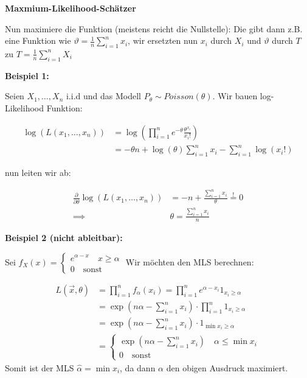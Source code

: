 \documentclass[25pt]{sciposter}
\renewcommand{\hat}{\widehat}
\newenvironment{method}[1]{\begin{mdframed}[backgroundcolor=blue!10,innertopmargin=15pt, innerbottommargin=15pt,nobreak=true]
		\textbf{#1 }
	}
	{ 
	\end{mdframed}
}
\begin{document}
\begin{multicols}{3}
\begin{method}{Maxmium-Likelihood-Schätzer}
			Nun maximiere die Funktion (meistens reicht die Nullstelle): Die gibt dann z.B. eine Funktion wie $\vartheta = \frac{1}{n}\sum_{i=1}^{n}x_i$, wir ersetzten nun $x_i$ durch $X_i$ und $\vartheta$ durch $T$ zu $T = \frac{1}{n}\sum_{i=1}^{n}X_i$
		\end{method}
		
		\textbf{Beispiel 1:}
		
		Seien $X_1,\ldots,X_n$ i.i.d und das Modell $P_{\theta}\sim Poisson(\theta)$. Wir bauen log-Likelihood Funktion:
		
		\begin{align*}
			\log(L(x_1,\ldots,x_n)) &= \log\left(\prod_{i=1}^{n} e^{-\theta} \frac{\theta^{x_i}}{x_i !} \right)\\ &= -\theta n + \log(\theta) \sum_{i=1}^{n} x_i - \sum_{i=1}^{n}\log(x_i !)
		\end{align*}
		
		nun leiten wir ab:
		
		\begin{align*}
			\frac{\partial}{\partial \theta}\log(L(x_1,\ldots,x_n)) &= -n + \frac{\sum_{i=1}^{n}x_i}{\theta} \stackrel{!}{=} 0 \\
			\implies & \theta = \frac{\sum_{i=1}^{n} x_i}{n}
		\end{align*}
		
		\textbf{Beispiel 2 (nicht ableitbar):}
		
		Sei $f_X(x) = \begin{cases}
			e^{\alpha - x} \quad x \geq \alpha\\
			0 \quad \text{sonst}
		\end{cases}$ Wir möchten den MLS berechnen:
		
		\begin{align*}
			L(\vec{x},\theta) &= \prod_{i=1}^{n} f_\alpha (x_i) = \prod_{i=1}^{n} e^{\alpha - x_i} 1_{x_i \geq \alpha}\\
			&= \exp \left(n\alpha - \sum_{i=1}^{n} x_i \right) \cdot \prod_{i=1}^{n} 1_{x_i\geq \alpha}\\
			&= \exp \left(n\alpha - \sum_{i=1}^{n} x_i \right) \cdot 1_{\min x_i \geq \alpha}\\
			&= \begin{cases}
				\exp (n \alpha - \sum_{i=1}^{n} x_i) \quad \alpha \leq \min x_i\\
				0 \quad \text{sonst}
			\end{cases}
		\end{align*}
		Somit ist der MLS $\hat{\alpha} = \min x_i$, da dann $\alpha$ den obigen Ausdruck maximiert.
		

\end{multicols}
\end{document}
